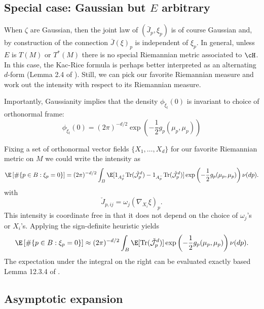 \documentclass{article}
\begin{document}
\subsection{Special case: Gaussian but $E$ arbitrary}

When $\zeta$ are Gaussian, then the joint law of $(\bar{J}_p,\xi_p)$ is of course Gaussian and, by construction of
the connection
$\bar{J}(\xi)_p$ is independent of $\xi_p$. In general, unless $E$ is $T(M)$ or $T^*(M)$ there is no
special Riemannian metric associated to $\cH$. In this case, the Kac-Rice formula is perhaps better interpreted
as an alternating $d$-form (Lemma 2.4 of \cite{EulerCharManifolds}).
Still, we can pick our favorite Riemannian measure and work out the intensity
with respect to its Riemannian measure.

Importantly, Gaussianity implies that
the density $\phi_{\breve{\xi}_t}(0)$ is invariant to choice of orthonormal frame:
$$
\phi_{\breve{\xi}_t}(0) = (2\pi)^{-d/2} \exp\left(-\frac{1}{2} g_p(\mu_p, \mu_p) \right)
$$

Fixing a set of orthonormal vector fields $\{X_1,\dots, X_d\}$ for our favorite Riemannian metric on $M$ we could
write the intensity as
$$
\begin{aligned}
\E \left[\# \{p \in B: \xi_p=0\} \right] &=  (2 \pi)^{-d/2}\int_{B} \E[1_{A^+_p} \text{Tr}(\check{\cal J}^d_p) - 1_{A^-_p} \text{Tr}(\check{\cal J}^d_p)]  \exp\left(-\frac{1}{2} g_p(\mu_{p}, \mu_{p}) \right) \nu(dp). \\
\end{aligned}
$$
with
$$
\check{J}_{p,ij} =  \omega_j(\nabla_{X_i}\xi)_{p}.
$$
This intensity is coordinate free in that it does not depend on the choice of $\omega_j$'s or $X_i$'s.
Applying the sign-definite heuristic yields
$$
\begin{aligned}
\E \left[\# \{p \in B: \xi_p=0\} \right] & \approx  (2 \pi)^{-d/2}\int_{B} \E[ \text{Tr}(\check{\cal J}^d_p)]  \exp\left(-\frac{1}{2} g_p(\mu_{p}, \mu_{p}) \right) \nu(dp). \\
\end{aligned}
$$
The expectation under the integral on the right can be evaluated exactly based Lemma 12.3.4 of \cite{RFG}.

\subsection{Asymptotic expansion}
\end{document}
